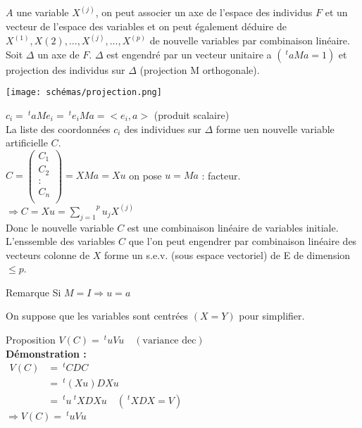 \documentclass[a4paper, 12pt]{article}
\begin{document}
$A$ une variable $X^{(j)}$, on peut associer un axe de l'espace des individus $F$ et un vecteur de l'espace des variables et on peut également déduire de $X^{(1)}, X{(2)}, ..., X^{(j)}, ..., X^{(p)}$ de nouvelle variables par combinaison linéaire. \\
Soit $\Delta$ un axe de $F$. $\Delta$ est engendré par un vecteur unitaire a $(\ ^t a M a = 1)$ et projection des individus sur $\Delta$ (projection M orthogonale).

\begin{center}
\texttt{[image: schémas/projection.png]}
\end{center}

$c_i = \ ^t a M e_i = \ ^t e_i Ma = <e_i, a>$ (produit scalaire) \\

La liste des coordonnées $c_i$ des individues sur $\Delta$ forme uen nouvelle variable artificielle $C$.\\

$C =
\begin{pmatrix}
C_1 \\
C_2 \\
: \\
C_n \\
\end{pmatrix}
 = X Ma = Xu$ on pose $u = Ma$ : facteur. \\
 $\Rightarrow C = Xu = \overset{p}{\underset{j = 1}{\sum}} u_j X^{(j)}$ \\
 
 Donc le nouvelle variable $C$ est une combinaison linéaire de variables initiale. L'enssemble des variables $C$ que l'on peut engendrer par combinaison linéaire des vecteurs colonne de $X$ forme un s.e.v. (sous espace vectoriel) de E de dimension $\leqslant p$. \\
 
\begin{remarque}{Remarque}
Si $M = I \Rightarrow u = a$
\end{remarque}

On suppose que les variables sont centrées $(X = Y)$ pour simplifier.

\begin{proposition}{Proposition}
$\boxed{V(C) = \ ^t u Vu} \quad (\text{variance dec})$ \\

\textbf{Démonstration :} \\
$
\begin{aligned}
V(C) &= \ ^t CDC \\
&= \ ^t (Xu) DXu \\
&= \ ^t u \ ^t XDXu \quad (\ ^t XDX = V)
\end{aligned}
$ \\
$\Rightarrow V(C) = \ ^t u Vu$
\end{proposition}
\end{document}
